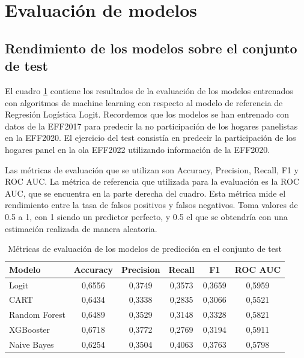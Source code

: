 \section{Evaluación de modelos}
\label{section:evaluation_models}

\subsection*{Rendimiento de los modelos sobre el conjunto de test}
El cuadro \ref{table:test} contiene los resultados de la evaluación de los modelos entrenados con algoritmos de machine learning con respecto al modelo de referencia de Regresión Logística Logit. Recordemos que los modelos se han entrenado con datos de la EFF2017 para predecir la no participación de los hogares panelistas en la EFF2020. El ejercicio del test consistía en predecir la participación de los hogares panel en la ola EFF2022 utilizando información de la EFF2020.

Las métricas de evaluación que se utilizan son Accuracy, Precision, Recall, F1 y ROC AUC. La métrica de referencia que utilizada para la evaluación es la ROC AUC, que se encuentra en la parte derecha del cuadro. Esta métrica mide el rendimiento entre la tasa de falsos positivos y falsos negativos. Toma valores de 0.5 a 1, con 1 siendo un predictor perfecto, y 0.5 el que se obtendría con una estimación realizada de manera aleatoria.

\begin{table}[ht]
    \centering
    \begin{tabular}{lccccc}
    \hline
        \textbf{Modelo} & \textbf{Accuracy} & \textbf{Precision} & \textbf{Recall} & \textbf{F1} & \textbf{ROC AUC} \\ \hline
        Logit & 0,6556 & 0,3749 & 0,3573 & 0,3659 & 0,5959 \\ 
        CART & 0,6434 & 0,3338 & 0,2835 & 0,3066 & 0,5521 \\ 
        Random Forest & 0,6489 & 0,3529 & 0,3148 & 0,3328 & 0,5821 \\ 
        XGBooster & 0,6718 & 0,3772 & 0,2769 & 0,3194 & 0,5911 \\ 
        Naive Bayes & 0,6254 & 0,3504 & 0,4063 & 0,3763 & 0,5798 \\ \hline
    \end{tabular}
    \caption{Métricas de evaluación de los modelos de predicción en el conjunto de test}
    \label{table:test}
\end{table}

